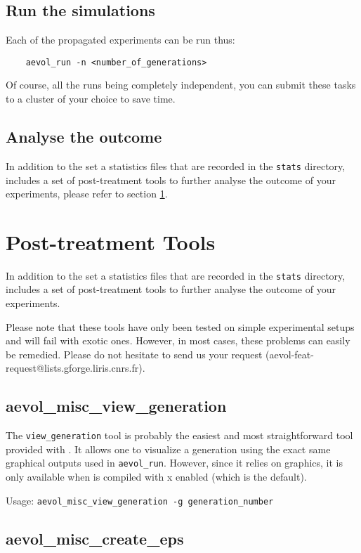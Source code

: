\subsection{Run the simulations}
Each of the propagated experiments can be run thus:
\begin{verbatim}
	aevol_run -n <number_of_generations>
\end{verbatim}
Of course, all the runs being completely independent, you can submit these tasks to a cluster of your choice to save time.


\subsection{Analyse the outcome}

In addition to the set a statistics files that are recorded in the \verb?stats? directory, \aevol{} includes a set of post-treatment tools to further analyse the outcome of your experiments, please refer to section \ref{sect:post-treatments}.


\section{Post-treatment Tools}
\label{sect:post-treatments}

In addition to the set a statistics files that are recorded in the \verb?stats? directory, \aevol{} includes a set of post-treatment tools to further analyse the outcome of your experiments.

Please note that these tools have only been tested on simple experimental setups and will fail with exotic ones.
However, in most cases, these problems can easily be remedied. Please do not hesitate to send us your request (aevol-feat-request@lists.gforge.liris.cnrs.fr).

\subsection{aevol\_misc\_view\_generation}
\label{sect:view-gener}
The \verb?view_generation? tool is probably the easiest and most straightforward tool provided with \aevol{}.
It allows one to visualize a generation using the exact same graphical outputs used in \verb?aevol_run?.
However, since it relies on graphics, it is only available when \aevol{} is compiled with x enabled (which is the default).

Usage: \verb?aevol_misc_view_generation -g generation_number?

\subsection{aevol\_misc\_create\_eps}
\label{sect:create-eps}


